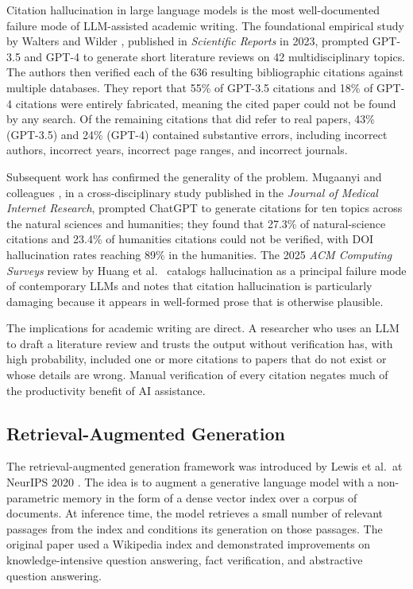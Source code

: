 Citation hallucination in large language models is the most well-documented failure mode of LLM-assisted academic writing. The foundational empirical study by Walters and Wilder \cite{walters2023fabrication}, published in \textit{Scientific Reports} in 2023, prompted GPT-3.5 and GPT-4 to generate short literature reviews on 42 multidisciplinary topics. The authors then verified each of the 636 resulting bibliographic citations against multiple databases. They report that 55\% of GPT-3.5 citations and 18\% of GPT-4 citations were entirely fabricated, meaning the cited paper could not be found by any search. Of the remaining citations that did refer to real papers, 43\% (GPT-3.5) and 24\% (GPT-4) contained substantive errors, including incorrect authors, incorrect years, incorrect page ranges, and incorrect journals.

Subsequent work has confirmed the generality of the problem. Mugaanyi and colleagues \cite{mugaanyi2024llmcitations}, in a cross-disciplinary study published in the \textit{Journal of Medical Internet Research}, prompted ChatGPT to generate citations for ten topics across the natural sciences and humanities; they found that 27.3\% of natural-science citations and 23.4\% of humanities citations could not be verified, with DOI hallucination rates reaching 89\% in the humanities. The 2025 \textit{ACM Computing Surveys} review by Huang et al.\ \cite{huang2025hallucination} catalogs hallucination as a principal failure mode of contemporary LLMs and notes that citation hallucination is particularly damaging because it appears in well-formed prose that is otherwise plausible.

The implications for academic writing are direct. A researcher who uses an LLM to draft a literature review and trusts the output without verification has, with high probability, included one or more citations to papers that do not exist or whose details are wrong. Manual verification of every citation negates much of the productivity benefit of AI assistance.

\subsection{Retrieval-Augmented Generation}

The retrieval-augmented generation framework was introduced by Lewis et al.\ at NeurIPS 2020 \cite{lewis2020rag}. The idea is to augment a generative language model with a non-parametric memory in the form of a dense vector index over a corpus of documents. At inference time, the model retrieves a small number of relevant passages from the index and conditions its generation on those passages. The original paper used a Wikipedia index and demonstrated improvements on knowledge-intensive question answering, fact verification, and abstractive question answering.

